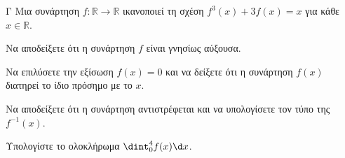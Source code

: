 \begin{thema}{Γ}
Μια συνάρτηση $f: \mathbb{R} \to \mathbb{R}$ ικανοποιεί τη σχέση $f^3(x) + 3f(x) = x$ για κάθε $x \in \mathbb{R}$.
\begin{erwthma}
  \item Να αποδείξετε ότι η συνάρτηση $f$ είναι γνησίως αύξουσα. 
  \item Να επιλύσετε την εξίσωση $f(x) = 0$ και να δείξετε ότι η συνάρτηση $f(x)$ διατηρεί το ίδιο πρόσημο με το $x$.
  \item Να αποδείξετε ότι η συνάρτηση αντιστρέφεται και να υπολογίσετε τον τύπο της $f^{-1}(x)$.
  \item Υπολογίστε το ολοκλήρωμα $\dint_0^4 f(x)\d x$.
\end{erwthma}
\end{thema}
